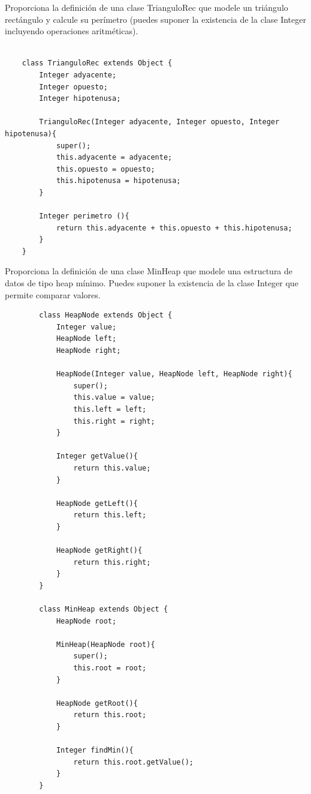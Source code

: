 \begin{exercise}
    Proporciona la definición de una clase \textsf{TrianguloRec} que modele un triángulo rectángulo y calcule su perímetro (puedes suponer la existencia de la clase \textsf{Integer} incluyendo operaciones aritméticas). 
    \begin{verbatim}
    
    class TrianguloRec extends Object {
        Integer adyacente;
        Integer opuesto;
        Integer hipotenusa;
    
        TrianguloRec(Integer adyacente, Integer opuesto, Integer hipotenusa){
            super();
            this.adyacente = adyacente;
            this.opuesto = opuesto;
            this.hipotenusa = hipotenusa;
        }
    
        Integer perimetro (){
            return this.adyacente + this.opuesto + this.hipotenusa;
        }
    }
    \end{verbatim}
\end{exercise}

\begin{exercise}
	Proporciona la definición de una clase \textsf{MinHeap} que modele una
	estructura de datos de tipo heap mínimo. Puedes suponer la existencia
	de la clase \textsf{Integer} que permite comparar valores.
	
	\begin{verbatim}
		class HeapNode extends Object {
			Integer value;
			HeapNode left;
			HeapNode right;
			
			HeapNode(Integer value, HeapNode left, HeapNode right){
				super();
				this.value = value;
				this.left = left;
				this.right = right;
			}
			
			Integer getValue(){
				return this.value;
			}
			
			HeapNode getLeft(){
				return this.left;
			}
			
			HeapNode getRight(){
				return this.right;
			}
		}
		
		class MinHeap extends Object {
			HeapNode root;
			
			MinHeap(HeapNode root){
				super();
				this.root = root;
			}
			
			HeapNode getRoot(){
				return this.root;
			}
			
			Integer findMin(){
				return this.root.getValue();
			}
		}
	\end{verbatim}
	
\end{exercise}

